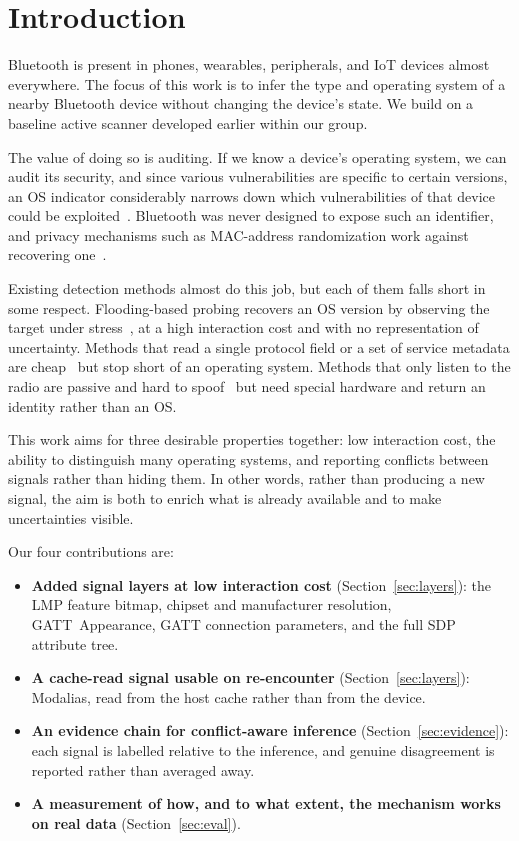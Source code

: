 \documentclass[conference]{IEEEtran}
\begin{document}
\section{Introduction}
Bluetooth is present in phones, wearables, peripherals, and IoT devices
almost everywhere. The focus of this work is to infer the type and operating
system of a nearby Bluetooth device without changing the device's state. We
build on a baseline active scanner developed earlier within our group.

The value of doing so is auditing. If we know a device's operating system, we
can audit its security, and since various vulnerabilities are specific to
certain versions, an OS indicator considerably narrows down which
vulnerabilities of that device could be
exploited~\cite{barua2022blethreats}. Bluetooth was never designed to expose
such an identifier, and privacy mechanisms such as MAC-address randomization
work against recovering one~\cite{martin2017macrandom}.

Existing detection methods almost do this job, but each of them falls short in
some respect. Flooding-based probing recovers an OS version by observing the
target under stress~\cite{kavisankar2024osid}, at a high interaction cost and
with no representation of uncertainty. Methods that read a single protocol
field or a set of service metadata are cheap~\cite{celosia2019gatt} but stop
short of an operating system. Methods that only listen to the radio are
passive and hard to spoof~\cite{santanacruz2024jsdivergence} but need special
hardware and return an identity rather than an OS.

This work aims for three desirable properties together: low interaction cost,
the ability to distinguish many operating systems, and reporting conflicts
between signals rather than hiding them. In other words, rather than producing
a new signal, the aim is both to enrich what is already available and to make
uncertainties visible.

Our four contributions are:

\begin{itemize}
  \item \textbf{Added signal layers at low interaction cost}
  (Section~\ref{sec:layers}): the LMP feature bitmap, chipset and
  manufacturer resolution, GATT~Appearance, GATT connection parameters, and
  the full SDP attribute tree.
  \item \textbf{A cache-read signal usable on re-encounter}
  (Section~\ref{sec:layers}): Modalias, read from the host cache rather than
  from the device.
  \item \textbf{An evidence chain for conflict-aware inference}
  (Section~\ref{sec:evidence}): each signal is labelled relative to the
  inference, and genuine disagreement is reported rather than averaged away.
  \item \textbf{A measurement of how, and to what extent, the mechanism works
  on real data} (Section~\ref{sec:eval}).
\end{itemize}
\end{document}
